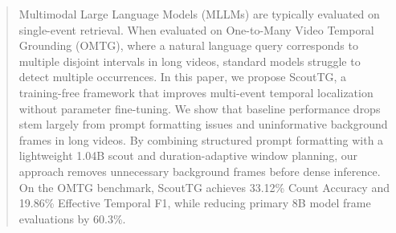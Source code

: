 \begin{abstract}
Multimodal Large Language Models (MLLMs) are typically evaluated on single-event retrieval. When evaluated on One-to-Many Video Temporal Grounding (OMTG), where a natural language query corresponds to multiple disjoint intervals in long videos, standard models struggle to detect multiple occurrences. In this paper, we propose ScoutTG, a training-free framework that improves multi-event temporal localization without parameter fine-tuning. We show that baseline performance drops stem largely from prompt formatting issues and uninformative background frames in long videos. By combining structured prompt formatting with a lightweight 1.04B scout and duration-adaptive window planning, our approach removes unnecessary background frames before dense inference. On the OMTG benchmark, ScoutTG achieves 33.12\% Count Accuracy and 19.86\% Effective Temporal F1, while reducing primary 8B model frame evaluations by 60.3\%.

\end{abstract}
